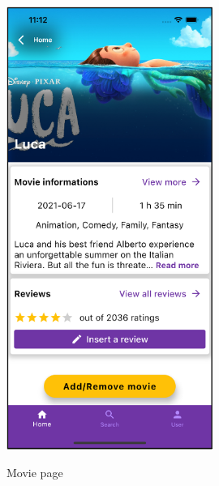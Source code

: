\documentclass[12pt, a4paper]{article}
\numberwithin{figure}{section}
\begin{document}
\begin{center}
	\begin{minipage}[t]{0.4\textwidth}
		\begin{figure}[H]
			\centering
			\includegraphics[width=0.6\textwidth]{images/final/movie.png}\\
			\caption{Movie page}
		\end{figure}
	\end{minipage}
	\hspace{0.015\linewidth}
	\begin{minipage}[t]{0.4\textwidth}
		\begin{figure}[H]
			\centering

\end{figure}
\end{minipage}
\end{center}
\end{document}
